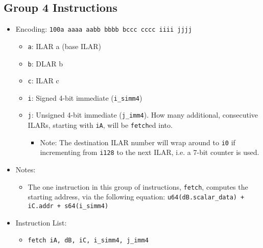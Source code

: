 \documentclass{article}
\begin{document}
	\subsection{Group 4 Instructions}
		\begin{itemize}
		\item Encoding:  \texttt{100a aaaa aabb bbbb  bccc cccc iiii jjjj}
			\begin{itemize}
			\item \texttt{a}:  ILAR a (base ILAR)
			\item \texttt{b}:  DLAR b
			\item \texttt{c}:  ILAR c
			\item \texttt{i}:  Signed 4-bit immediate (\texttt{i\_simm4})
			\item \texttt{j}:  Unsigned 4-bit immediate (\texttt{j\_imm4}).
				How many additional, consecutive ILARs, starting with
				\texttt{iA}, will be \texttt{fetch}ed into.
				\begin{itemize}
				\item Note:  The destination ILAR number will wrap around
					to \texttt{i0} if incrementing from \texttt{i128} to
					the next ILAR, i.e. a 7-bit counter is used.
				\end{itemize}
			\end{itemize}
		\item Notes:
			\begin{itemize}
			\item The one instruction in this group of instructions,
				\texttt{fetch}, computes the starting address, via the
				following equation:  \texttt{u64(dB.scalar\_data) + iC.addr
					+ s64(i\_simm4)}
			\end{itemize}
		\item Instruction List:
			\begin{itemize}
			\item \texttt{fetch iA, dB, iC, i\_simm4, j\_imm4}
			\end{itemize}
		\end{itemize}
\end{document}
